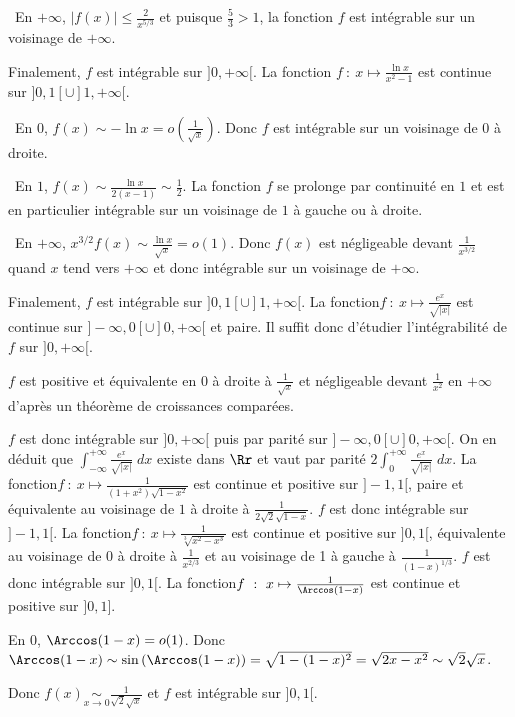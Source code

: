 {{\textbullet~En $+\infty$, $|f(x)|\leqslant\frac{2}{x^{5/3}}$ et puisque $\frac{5}{3}>1$, la fonction $f$ est intégrable sur  un voisinage de $+\infty$.

Finalement, $f$ est intégrable sur $]0,+\infty[$.
La fonction $f~:~x\mapsto\frac{\ln x}{x^2-1}$ est continue sur $]0,1[\cup]1,+\infty[$.

\textbullet~En $0$,  $f(x)\sim-\ln x=o\left(\frac{1}{\sqrt{x}}\right)$. Donc $f$ est intégrable sur un voisinage de $0$ à droite.

\textbullet~En $1$, $f(x)\sim\frac{\ln x}{2(x-1)}\sim\frac{1}{2}$. La fonction $f$ se prolonge par continuité en $1$ et est en particulier intégrable sur un voisinage de $1$ à gauche ou à droite.

\textbullet~En $+\infty$,  $x^{3/2}f(x)\sim\frac{\ln x}{\sqrt{x}}=o(1)$. Donc $f(x)$ est négligeable devant $\frac{1}{x^{3/2}}$ quand $x$ tend vers $+\infty$ et donc intégrable sur un voisinage de $+\infty$.

Finalement, $f$ est intégrable sur $]0,1[\cup]1,+\infty[$.
La fonction$f~:~x\mapsto\frac{e^x}{\sqrt{|x|}}$ est continue sur $]-\infty,0[\cup]0,+\infty[$ et paire. Il suffit donc d'étudier l'intégrabilité de $f$ sur $]0,+\infty[$.

$f$ est positive et équivalente en $0$ à droite à $\frac{1}{\sqrt{x}}$ et négligeable devant $\frac{1}{x^2}$  en $+\infty$ d'après un théorème de croissances comparées.

$f$ est donc intégrable sur $]0,+\infty[$ puis par parité sur $]-\infty,0[\cup]0,+\infty[$. On en déduit que $\int_{-\infty}^{+\infty}\frac{e^x}{\sqrt{|x|}}\;dx$ existe dans $\Rr$ et vaut par parité $2\int_{0}^{+\infty}\frac{e^x}{\sqrt{|x|}}\;dx$.
La fonction$f~:~x\mapsto\frac{1}{(1+x^2)\sqrt{1-x^2}}$ est continue et positive sur $]-1,1[$, paire et équivalente au voisinage de $1$ à droite à $\frac{1}{2\sqrt{2}\sqrt{1-x}}$. $f$ est donc intégrable sur $]-1,1[$.
La fonction$f~:~x\mapsto\frac{1}{\sqrt[3]{x^2-x^3}}$ est continue et positive sur $]0,1[$, équivalente au voisinage de $0$ à droite à $\frac{1}{x^{2/3}}$ et au voisinage de 1 à gauche à $\frac{1}{(1-x)^{1/3}}$. $f$ est donc intégrable sur $]0,1[$.
La fonction$f~:~x\mapsto\frac{1}{\Arccos(1-x)}$ est continue et positive sur $]0,1]$.

En $0$, $\Arccos(1-x) = o(1)$. Donc $\Arccos(1-x)\sim\sin\left(\Arccos(1-x)\right)=\sqrt{1-(1-x)^2}=\sqrt{2x-x^2}\sim\sqrt{2}\sqrt{x}$.

Donc $f(x)\underset{x\rightarrow0}{\sim}\frac{1}{\sqrt{2}\sqrt{x}}$ et $f$ est intégrable sur $]0,1[$.
}
}
